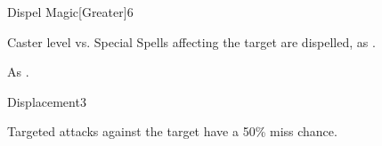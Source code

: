\begin{spellsection}{Dispel Magic}[Greater]{6}
\begin{spellheader}
\end{spellheader}
\begin{spellcontent}
    \begin{spelltargetinginfo}
    \end{spelltargetinginfo}
    \begin{spelleffects}
        \begin{spellattack}{Caster level vs. Special}
            \spelleffect Spells affecting the target are dispelled, as .
        \end{spellattack}
    \end{spelleffects}
\end{spellcontent}
\begin{spellfooter}
    \spellnotes As .
\end{spellfooter}
\end{spellsection}

\begin{spellsection}{Displacement}{3}
\begin{spellheader}
\end{spellheader}
\begin{spellcontent}
    \begin{spelltargetinginfo}
    \end{spelltargetinginfo}
    \begin{spelleffects}
        \spelleffect Targeted attacks against the target have a 50\% miss chance. 
        \spelldur \durshort \dismissable
    \end{spelleffects}
\end{spellcontent}
\begin{spellfooter}
\end{spellfooter}
\end{spellsection}

